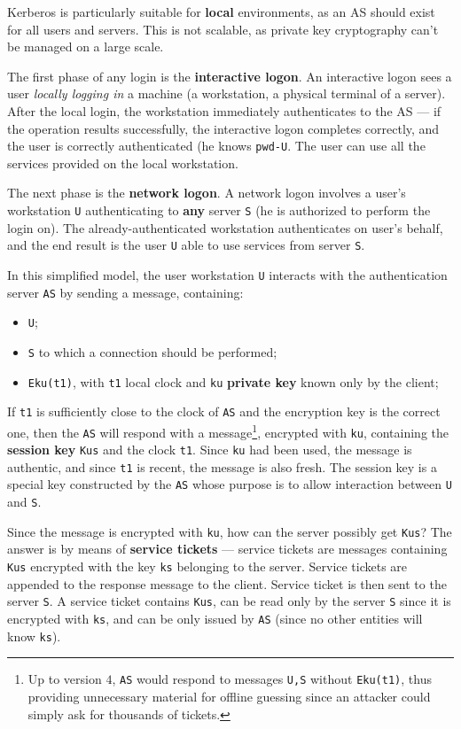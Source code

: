 \documentclass[10pt]{\classname}
\begin{document}
Kerberos is particularly suitable for \textbf{local} environments, as an AS
should exist for all users and servers. This is not scalable, as private key
cryptography can't be managed on a large scale.

The first phase of any login is the \textbf{interactive logon}. An interactive
logon sees a user \emph{locally logging in} a machine (a workstation, a
physical terminal of a server). After the local login, the workstation
immediately authenticates to the AS --- if the operation results successfully,
the interactive logon completes correctly, and the user is correctly
authenticated (he knows \texttt{pwd-U}. The user can use all the services
provided on the local workstation.

The next phase is the \textbf{network logon}. A network logon involves a user's
workstation \texttt{U} authenticating to \textbf{any} server \texttt{S} (he is
authorized to perform the login on). The already\--authenticated workstation
authenticates on user's behalf, and the end result is the user \texttt{U} able
to use services from server \texttt{S}.

In this simplified model, the user workstation \texttt{U} interacts with the authentication server \texttt{AS} by sending a message, containing:
\begin{itemize}
    \item \texttt{U};
    \item \texttt{S} to which a connection should be performed;
    \item \texttt{Eku(t1)}, with \texttt{t1} local clock and \texttt{ku}
        \textbf{private key} known only by the client;
\end{itemize}

If \texttt{t1} is sufficiently close to the clock of \texttt{AS} and the
encryption key is the correct one, then the \texttt{AS} will respond with a
message\footnote{Up to version $4$, \texttt{AS} would respond to messages
\texttt{U,S} without \texttt{Eku(t1)}, thus providing unnecessary material for
offline guessing since an attacker could simply ask for thousands of tickets.},
encrypted with \texttt{ku}, containing the \textbf{session key} \texttt{Kus}
and the clock \texttt{t1}. Since \texttt{ku} had been used, the message is
authentic, and since \texttt{t1} is recent, the message is also fresh. The
session key is a special key constructed by the \texttt{AS} whose purpose is to
allow interaction between \texttt{U} and \texttt{S}.

Since the message is encrypted with \texttt{ku}, how can the server possibly
get \texttt{Kus}? The answer is by means of \textbf{service tickets} --- service
tickets are messages containing \texttt{Kus} encrypted with the key \texttt{ks}
belonging to the server. Service tickets are appended to the response message
to the client. Service ticket is then sent to the server \texttt{S}. A service
ticket contains \texttt{Kus}, can be read only by the server \texttt{S} since
it is encrypted with \texttt{ks}, and can be only issued by \texttt{AS} (since
no other entities will know \texttt{ks}).
\end{document}
